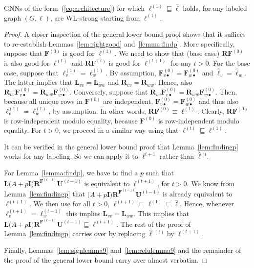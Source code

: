 \begin{corollary}
GNNs of the form~(\ref{eq:architecture}) for which 
$\pmb{\ell}^{(1)}\sqsubseteq\hat{\pmb{\ell}}$ holds, for any labeled graph $(G,\pmb{\ell})$, are WL-strong starting from $\pmb{\ell}^{(1)}$.
\end{corollary}
\begin{proof}
A closer inspection of the general lower bound proof shows that it suffices to re-establish
Lemmas~\ref{lem:rightgood} and~\ref{lemma:findp}. More specifically, suppose that 
$\mathbf{F}^{(0)}$ is good for $\pmb{\ell}^{(1)}$. We need to show that (base case)
$\mathbf{R}\mathbf{F}^{(0)}$ is also good for $\pmb{\ell}^{(1)}$ and 
$\mathbf{R}\mathbf{F}^{(t)}$ is good for $\pmb{\ell}^{(t+1)}$ for any $t>0$.
For the base case, suppose that 
$\pmb{\ell}^{(1)}_v=\pmb{\ell}^{(1)}_w$. By assumption, $\mathbf{F}^{(0)}_{v\bullet}=\mathbf{F}^{(0)}_{w\bullet}$ and 
$\hat{\pmb{\ell}}_v=\hat{\pmb{\ell}}_w$. The latter implies that $\mathbf{L}_{vv}=\mathbf{L}_{ww}$ and $\mathbf{R}_{vv}=\mathbf{R}_{ww}$. Hence,
also $\mathbf{R}_{vv}\mathbf{F}^{(0)}_{v\bullet}=\mathbf{R}_{ww}\mathbf{F}^{(0)}_{w\bullet}$.
Conversely, suppose that 
$\mathbf{R}_{vv}\mathbf{F}^{(0)}_{v\bullet}=\mathbf{R}_{ww}\mathbf{F}^{(0)}_{w\bullet}$.
Then, because all unique rows in $\mathbf{F}^{(0)}$ are independent, $\mathbf{F}^{(0)}_{v\bullet}=\mathbf{F}^{(0)}_{w\bullet}$ and thus also 
$\pmb{\ell}^{(1)}_v=\pmb{\ell}^{(1)}_w$, by assumption. In other words, 
$\mathbf{R}\mathbf{F}^{(0)}\equiv\pmb{\ell}^{(1)}$.
Clearly, $\mathbf{R}\mathbf{F}^{(0)}$ is row-independent modulo equality, because
$\mathbf{F}^{(0)}$ is row-independent modulo equality.
For $t>0$, we proceed in a similar way using that $\pmb{\ell}^{(t)}\sqsubseteq \pmb{\ell}^{(1)}$. 

It can be verified in the general lower bound proof that Lemma~\ref{lem:findingp}
works for any labeling. So we can apply it to $\pmb{\ell}^{t+1}$ rather than $\hat{\pmb{\ell}}{}^{)t}$. 

For Lemma~\ref{lemma:findp}, we have to find a $p$ such that 
$\mathbf{L}\mathbf(A+p\mathbf{I})\mathbf{R}^{\mathbf{F}^{(t-1)}}\mathbf{U}^{(t-1)}$
is equivalent to $\pmb{\ell}^{(t+1)}$, for $t>0$. We know from Lemma~\ref{lem:findingp} that
$\mathbf(A+p\mathbf{I})\mathbf{R}^{\mathbf{F}^{(t-1)}}\mathbf{U}^{(t-1)}$ is already equivalent to $\pmb{\ell}^{(t+1)}$. We then use for all $t>0$, $\pmb{\ell}^{(t+1)}\sqsubseteq\pmb{\ell}^{(1)}\sqsubseteq \hat{\pmb{\ell}}$. Hence,
whenever $\pmb{\ell}^{(t+1)}_v=\pmb{\ell}^{(t+1)}_w$ this implies $\mathbf{L}_{vv}=\mathbf{L}_{ww}$. This implies that 
$\mathbf{L}\mathbf(A+p\mathbf{I})\mathbf{R}^{\mathbf{F}^{(t-1)}}\mathbf{U}^{(t-1)}\sqsubseteq \pmb{\ell}^{(t+1)}$. The rest of the proof of Lemma~\ref{lem:findingp}  carries over by replacing $\hat{\pmb{\ell}}{}^{(t)}$ by $\pmb{\ell}^{(t+1)}$.

Finally, Lemmas~\ref{lem:signlemma9} and~\ref{lem:relulemma9} and the remainder of the proof of the general lower bound carry over almost verbatim.
\end{proof}

